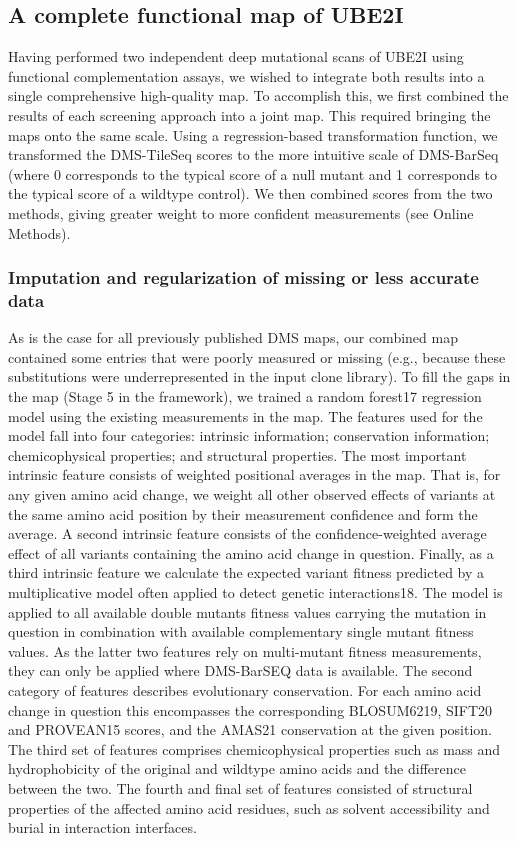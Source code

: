 \subsection{A complete functional map of UBE2I}

Having performed two independent deep mutational scans of UBE2I using functional complementation assays, we wished to integrate both results into a single comprehensive high-quality map. To accomplish this, we first combined the results of each screening approach into a joint map.  This required bringing the maps onto the same scale. Using a regression-based transformation function, we transformed the DMS-TileSeq scores to the more intuitive scale of DMS-BarSeq (where 0 corresponds to the typical score of a null mutant and 1 corresponds to the typical score of a wildtype control). We then combined scores from the two methods, giving greater weight to more confident measurements (see Online Methods).

\subsubsection{Imputation and regularization of missing or less accurate data}

As is the case for all previously published DMS maps, our combined map contained some entries that were poorly measured or missing (e.g., because these substitutions were underrepresented in the input clone library). To fill the gaps in the map (Stage 5 in the framework), we trained a random forest17 regression model using the existing measurements in the map. The features used for the model fall into four categories: intrinsic information; conservation information; chemicophysical properties; and structural properties. The most important intrinsic feature consists of weighted positional averages in the map. That is, for any given amino acid change, we weight all other observed effects of variants at the same amino acid position by their measurement confidence and form the average. A second intrinsic feature consists of the confidence-weighted average effect of all variants containing the amino acid change in question. Finally, as a third intrinsic feature we calculate the expected variant fitness predicted by a multiplicative model often applied to detect genetic interactions18. The model is applied to all available double mutants fitness values carrying the mutation in question in combination with available complementary single mutant fitness values. As the latter two features rely on multi-mutant fitness measurements, they can only be applied where DMS-BarSEQ data is available. The second category of features describes evolutionary conservation. For each amino acid change in question this encompasses the corresponding BLOSUM6219, SIFT20 and PROVEAN15 scores, and the AMAS21 conservation at the given position. The third set of features comprises chemicophysical properties such as mass and hydrophobicity of  the original and wildtype amino acids and the difference between the two. The fourth and final set of features consisted of structural properties of the affected amino acid residues, such as solvent accessibility and burial in interaction interfaces.

